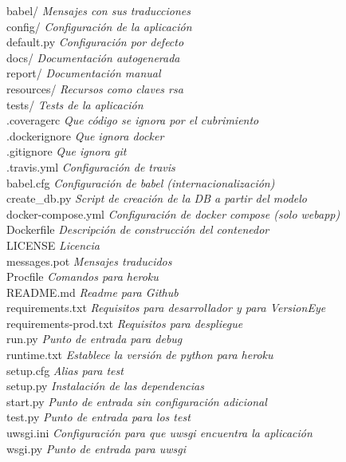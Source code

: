\begin{tabbing}
babel/ \> \> \> \> \> \textit{Mensajes con sus traducciones}\\
config/ \> \> \> \> \> \textit{Configuración de la aplicación}\\
\> default.py \> \> \> \> \textit{Configuración por defecto}\\
docs/ \> \> \> \> \> \textit{Documentación autogenerada}\\
report/ \> \> \> \> \> \textit{Documentación manual}\\
resources/\> \> \> \> \> \textit{Recursos como claves rsa}\\
tests/ \> \> \> \> \> \textit{Tests de la aplicación}\\
.coveragerc \> \> \> \> \> \textit{Que código se ignora por el cubrimiento}\\
.dockerignore \> \> \> \> \> \textit{Que ignora docker}\\
.gitignore \> \> \> \> \> \textit{Que ignora git}\\
.travis.yml \> \> \> \> \> \textit{Configuración de travis}\\
babel.cfg \> \> \> \> \> \textit{Configuración de babel (internacionalización)}\\
create\_db.py \> \> \> \> \> \textit{Script de creación de la DB a partir del modelo}\\
docker-compose.yml \> \> \> \> \> \textit{Configuración de docker compose (solo webapp)}\\
Dockerfile \> \> \> \> \> \textit{Descripción de construcción del contenedor}\\
LICENSE \> \> \> \> \> \textit{Licencia}\\
messages.pot \> \> \> \> \> \textit{Mensajes traducidos}\\
Procfile \> \> \> \> \> \textit{Comandos para heroku}\\
README.md \> \> \> \> \> \textit{Readme para Github}\\
requirements.txt \> \> \> \> \> \textit{Requisitos para desarrollador y para VersionEye}\\
requirements-prod.txt \> \> \> \> \> \textit{Requisitos para despliegue}\\
run.py \> \> \> \> \> \textit{Punto de entrada para debug} \\
runtime.txt \> \> \> \> \> \textit{Establece la versión de python para heroku}\\
setup.cfg \> \> \> \> \> \textit{Alias para test}\\
setup.py \> \> \> \> \> \textit{Instalación de las dependencias}\\
start.py \> \> \> \> \> \textit{Punto de entrada sin configuración adicional}\\
test.py \> \> \> \> \> \textit{Punto de entrada para los test}\\
uwsgi.ini  \> \> \> \> \> \textit{Configuración para que uwsgi encuentra la aplicación}\\
wsgi.py  \> \> \> \> \> \textit{Punto de entrada para uwsgi}\\
\end{tabbing}

